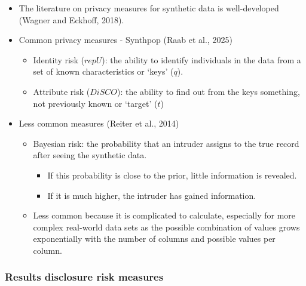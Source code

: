 \documentclass[t,8pt,utfx8]{beamer}
\begin{document}
\begin{spacing}{1.25}
\begin{frame}[t]
\begin{itemize}
    \item The literature on privacy measures for synthetic data is well-developed (Wagner and Eckhoff, 2018).  
    \item Common privacy measures - Synthpop (Raab et al., 2025)
    \begin{itemize}
        \item Identity risk ($repU$): the ability to identify individuals in the data from a set of known characteristics or `keys' ($q$).  
        \item Attribute risk ($DiSCO$): the ability to find out from the keys something, not previously known or `target' ($t$)
    \end{itemize}
    \item Less common measures (Reiter et al., 2014)
    \begin{itemize}
        \item Bayesian risk: the probability that an intruder assigns to the true record after seeing the synthetic data.  
        \begin{itemize}
            \item If this probability is close to the prior, little information is revealed.  
            \item If it is much higher, the intruder has gained information.  
        \end{itemize}
        \item Less common because it is complicated to calculate, especially for more complex real-world data sets as the possible combination of values grows exponentially with the number of columns and possible values per column.
    \end{itemize}
\end{itemize}
\end{frame}

\begin{frame}[t]\frametitle{Results disclosure risk measures}
\begin{minipage}[t]{0.48\textwidth}
    \begin{table}[]
        \centering
        \caption{x 1 synthetic data set (seed = 1237)}
        \resizebox{\textwidth}{!}{}
        \label{table:disclosure_risk_1}
    \end{table}
\end{minipage}%
\hfill%
\begin{minipage}[t]{0.48\textwidth}
    \begin{table}[]
        \centering
        \caption{x 10 synthetic data sets}
        \resizebox{\textwidth}{!}{}
        \label{table:disclosure_risk_10}
    \end{table}
\end{minipage}
\end{frame}




\end{spacing}
\end{document}
